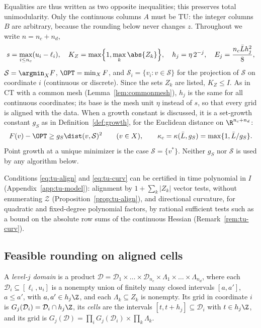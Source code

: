 Equalities are thus written as two opposite inequalities; this preserves
total unimodularity. Only the continuous columns $A$ must be TU: the integer
columns $B$ are arbitrary, because the rounding below never changes $z$.
Throughout we write $n=n_c+n_d$,
\[
s=\max_{i\le n_c}(u_i-\ell_i),\quad K_Z=\max\Bigl\{1,\max_k\abs{Z_k}\Bigr\},\quad
h_j=\eta\,2^{-j},\quad E_j=\frac{n_c\bar L h_j^2}{8},
\]
$\mathcal S=\argmin_XF$, $\OPT=\min_XF$, and
$\mathcal S_i=\{v_i:v\in\mathcal S\}$ for the projection of $\mathcal S$ on
coordinate $i$ (continuous or discrete). Since the sets $Z_k$ are listed,
$K_Z\le I$. As in CT with a common mesh (Lemma~\ref{lem:commonmesh}), $h_j$
is the same for all continuous coordinates; its base is the mesh unit $\eta$
instead of $s$, so that every grid is aligned with the data. When a growth
constant is discussed, it is a
set-growth constant $g_S$ as in Definition~\ref{def:growth}, for the
Euclidean distance on $\R^{n_c+n_d}$:
\begin{equation}\label{eq:tu-setgrowth}
F(v)-\OPT\ge g_S\dist(v,\mathcal S)^2\qquad(v\in X),\qquad
\kappa_c=\kappa(\bar L,g_S)=\max\{1,\bar L/g_S\}.
\end{equation}
Point growth at a unique minimizer is the case $\mathcal S=\{v^*\}$. Neither
$g_S$ nor $\mathcal S$ is used by any algorithm below.

Conditions \eqref{eq:tu-align} and \eqref{eq:tu-curv} can be certified in
time polynomial in $I$ (Appendix~\ref{app:tu-model}): alignment by
$1+\sum_k\lvert Z_k\rvert$ vector tests, without enumerating $\mathcal Z$
(Proposition~\ref{prop:tu-align}), and directional curvature, for quadratic
and fixed-degree polynomial factors, by rational sufficient tests such as a
bound on the absolute row sums of the continuous Hessian
(Remark~\ref{rem:tu-curv}).

\subsection{Feasible rounding on aligned cells}\label{sec:tu-rounding}

\begin{definition}\label{def:tu-domain}
A \emph{level-$j$ domain} is a product
$\mathcal D=\mathcal D_1\times\dots\times\mathcal D_{n_c}\times\Lambda_1\times\dots\times\Lambda_{n_d}$,
where each $\mathcal D_i\subseteq[\ell_i,u_i]$ is a nonempty union of finitely
many closed intervals $[a,a']$, $a\le a'$, with $a,a'\in h_j\Z$, and each
$\Lambda_k\subseteq Z_k$ is nonempty. Its grid in coordinate $i$ is
$G_j(\mathcal D_i)=\mathcal D_i\cap h_j\Z$, its \emph{cells} are the intervals
$[t,t+h_j]\subseteq\mathcal D_i$ with $t\in h_j\Z$, and its grid is
$G_j(\mathcal D)=\prod_iG_j(\mathcal D_i)\times\prod_k\Lambda_k$.
\end{definition}

